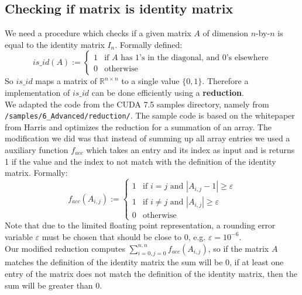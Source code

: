 \subsection*{Checking if matrix is identity matrix}
We need a procedure which checks if a given matrix $A$ of dimension $n$-by-$n$ is equal to the identity matrix $I_n$. Formally defined:
\begin{equation*}
is\_id(A) := \begin{cases}
1 & \text{if } A \text{ has 1's in the diagonal, and 0's elsewhere}\\
0 & \text{otherwise}
\end{cases}
\end{equation*}
So $is\_id$ maps a matrix of $\mathbb{R}^{n \times n}$ to a single value $\{0,1 \}$. Therefore a implementation of $is\_id$ can be done efficiently using a \textbf{reduction}.  \\
We adapted the code from the CUDA 7.5 samples directory, namely from \texttt{/samples/6\_Advanced/reduction/}. The sample code is based on the whitepaper from Harris \cite{Harris2010} and optimizes the reduction for a summation of an array. The modification we did was that instead of summing up all array entries we used a auxiliary function $f_{acc}$ which takes an entry and its index as input and is returns 1 if  the value and the index to not match with the definition of the identity matrix. Formally:
\begin{equation}
f_{acc}(A_{i,j}) := \begin{cases} 1 & \text{if }i = j \text{ and } |A_{i,j}-1| \geq \varepsilon\\
1 & \text{if } i \neq j \text{ and } |A_{i,j}| \geq \varepsilon\\
0 & \text{otherwise}	\end{cases}
\end{equation}
Note that due to the limited floating point representation, a rounding error variable $\varepsilon$ must be chosen that should be close to 0, e.g. $\varepsilon = 10^{-6}$. \\
Our modified reduction computes $\sum_{i=0,j=0}^{n,n} f_{acc}(A_{i,j})$, so if the matrix $A$ matches the definition of the identity matrix the sum will be 0, if at least one entry of the matrix does not match the definition of the identity matrix, then the sum will be greater than 0.

